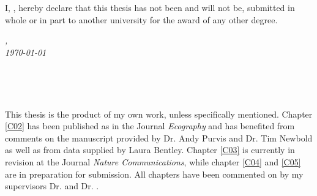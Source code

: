 

\vspace*{5cm}

\begin{flushleft}
	\large{\noindent I, \myName, hereby declare that this thesis has not been and will not be, submitted in whole or in part to another university for the award of any other degree.}
\end{flushleft}

\vspace*{2cm}

\begin{minipage}{.45\linewidth}
	\begin{flushleft} %
		\textit{\myLocation,} \\
		\textit{\today}%
	\end{flushleft}
\end{minipage}
\hfill
\begin{minipage}{.45\linewidth}
	\begin{flushright} %
		\makebox[2.5in]{\hrulefill} \\
		\myName 
	\end{flushright}
\end{minipage}\\ [0.5cm]



\vspace*{5cm}

\begin{flushleft}
	\noindent This thesis is the product of my own work, unless specifically mentioned. 
	Chapter \ref{C02} has been published as \cite{Jung2018} in the Journal \textit{Ecography} and has benefited from comments on the manuscript provided by Dr. Andy Purvis and Dr. Tim Newbold as well as from data supplied by Laura Bentley. Chapter \ref{C03} is currently in revision at the Journal \textit{Nature Communications}, while chapter \ref{C04} and \ref{C05} are in preparation for submission. All chapters have been commented on by my supervisors Dr. \myProf and Dr. \myOtherProf.
	    
\end{flushleft}


